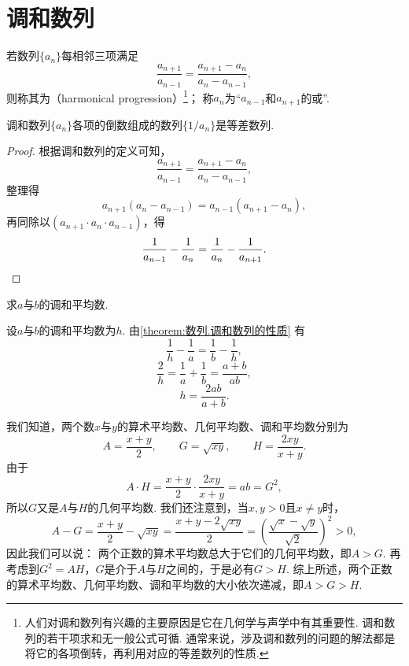 \section{调和数列}
若数列\(\{a_n\}\)每相邻三项满足\[
    \frac{a_{n+1}}{a_{n-1}}
    = \frac{a_{n+1}-a_n}{a_n-a_{n-1}},
\]
则称其为（harmonical progression）\footnote{%
人们对调和数列有兴趣的主要原因是它在几何学与声学中有其重要性.
调和数列的若干项求和无一般公式可循.
通常来说，涉及调和数列的问题的解法都是将它的各项倒转，再利用对应的等差数列的性质.
}；
称\(a_n\)为“\(a_{n-1}\)和\(a_{n+1}\)的或”.

\begin{property}\label{theorem:数列.调和数列的性质}
调和数列\(\{a_n\}\)各项的倒数组成的数列\(\{1/a_n\}\)是等差数列.
\begin{proof}
根据调和数列的定义可知，\[
    \frac{a_{n+1}}{a_{n-1}}
    = \frac{a_{n+1}-a_n}{a_n-a_{n-1}},
\]整理得\[
    a_{n+1} (a_n - a_{n-1})
    = a_{n-1} (a_{n+1} - a_n),
\]再同除以\((a_{n+1} \cdot a_n \cdot a_{n-1})\)，得\[
    \frac{1}{a_{n-1}} - \frac{1}{a_n}
    = \frac{1}{a_n} - \frac{1}{a_{n+1}}.
    \qedhere
\]
\end{proof}
\end{property}

\begin{example}
求\(a\)与\(b\)的调和平均数.
\begin{solution}
设\(a\)与\(b\)的调和平均数为\(h\).
由\cref{theorem:数列.调和数列的性质} 有\[
    \frac{1}{h} - \frac{1}{a}
    = \frac{1}{b} - \frac{1}{h},
\]\[
    \frac{2}{h} = \frac{1}{a} + \frac{1}{b}
    = \frac{a+b}{ab},
\]\[
    h = \frac{2ab}{a+b}.
\]
\end{solution}
\end{example}

我们知道，两个数\(x\)与\(y\)的算术平均数、几何平均数、调和平均数分别为\[
    A = \frac{x+y}{2}, \qquad
    G = \sqrt{xy}, \qquad
    H = \frac{2xy}{x+y}.
\]
由于\[
    A \cdot H = \frac{x+y}{2} \cdot \frac{2xy}{x+y}
    = ab = G^2,
\]
所以\(G\)又是\(A\)与\(H\)的几何平均数.
我们还注意到，当\(x,y>0\)且\(x \neq y\)时，\[
    A - G = \frac{x+y}{2} - \sqrt{xy}
    = \frac{x+y-2\sqrt{xy}}{2}
    = \left(\frac{\sqrt{x}-\sqrt{y}}{\sqrt{2}}\right)^2
    > 0,
\]
因此我们可以说：
两个正数的算术平均数总大于它们的几何平均数，即\(A > G\).
再考虑到\(G^2 = A H\)，\(G\)是介于\(A\)与\(H\)之间的，于是必有\(G > H\).
综上所述，两个正数的算术平均数、几何平均数、调和平均数的大小依次递减，即\(A > G > H\).


